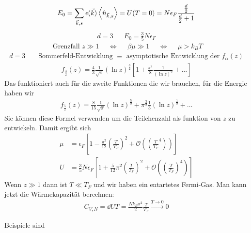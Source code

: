 %
%
\begin{align*}
  E_0 = \sum_{\vec{k},s}^{} \epsilon(\vec{k}) \Braket{\hat{n}_{\vec{k},s}}
= U(T = 0)  = N \epsilon_F
\frac{\frac{d}{2}}{\frac{d}{2} + 1}
\end{align*}
%
%
\begin{align*}
  d = 3 && E_0 = \frac{3}{5} N \epsilon_F
\end{align*}
%
%
\begin{align*}
  \text{ Grenzfall } z \gg 1 && \iff && \beta \mu \gg 1
  && \iff && \mu > k_B T
\end{align*}
%
%
\begin{align*}
  d = 3 && \text{ Sommerfeld-Entwicklung } \equiv \text{ asymptotische Entwicklung 
der } f_\alpha(z)
\end{align*}
%
%
\begin{align*}
  f_{\frac{3}{2}} (z) = \frac{4}{3} \frac{1}{\sqrt{\pi}}
  (\ln{ z}) ^{\frac{3}{2}} \left[ 1 + \frac{\pi^2}{8}
  \frac{1}{(\ln{z})^2} + \ldots \right]
\end{align*}
%
Das funktioniert auch für die zweite Funktionen die wir brauchen, 
für die Energie haben wir
%
\begin{align*}
  f_{\frac{5}{2}} (z) = \frac{8}{15} \frac{1}{\sqrt{\pi}} (\ln{z})^{\frac{5}{2}}
  + \pi^{\frac{3}{2}}\frac{1}{3} (\ln{z})^{\frac{1}{2}} + \ldots 
\end{align*}
%
Sie können diese Formel verwenden um die Teilchenzahl als funktion von 
$z$ zu entwickeln. Damit ergibt sich
%
\begin{align*}
  \mu & = \epsilon_F \left[  1- \frac{\pi^2}{12} \left( \frac{T}{T_F} \right)^2
  + \mathcal{O}\left( \left( \frac{T}{T_F}^4 \right) \right)\right] \\
  U & = \frac{3}{5} N \epsilon_F \left[ 1 + \frac{5}{12} \pi^2 \left( \frac{T }{T_F} \right)^{2} 
+ \mathcal{O}\left( \left( \frac{T}{T_F} \right)^4 \right)\right]
\end{align*}
%
Wenn $z \gg 1$ dann ist $T \ll T_F$ und wir haben ein entartetes Fermi-Gas.
Man kann jetzt die Wärmekapazität berechnen:
%
\begin{align*}
  C_{V, N} = \dd{U}{T} = \frac{N  k_B \pi^2}{2} \frac{T }{T_F} \xrightarrow{T\to 0} 0
\end{align*}
%

Beispiele sind 

